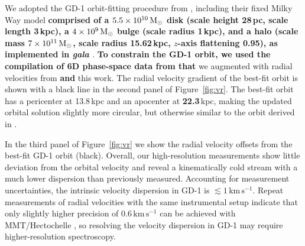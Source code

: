 \documentclass[twocolumn]{aastex63}
\newcommand{\package}[1]{\textsl{#1}}
\newcommand{\kms}{\ensuremath{\textrm{km}\,\textrm{s}^{-1}}}
\newcommand{\changes}[1]{{\textbf{#1}}}
\begin{document}
We adopted the GD-1 orbit-fitting procedure from \citet{pwb}, including their fixed Milky Way model \changes{comprised of a $5.5\times10^{10}\,\rm M_\odot$ \citet{mn1975} disk (scale height 28\,pc, scale length 3\,kpc), a $4\times10^9\,\rm M_\odot$ \citet{hernquist1990} bulge (scale radius 1\,kpc), and a \citet{navarro1997} halo (scale mass $7\times10^{11}\,\rm M_\odot$, scale radius 15.62\,kpc, $z$-axis flattening 0.95), as implemented in \package{gala} \citep{gala}}.
\changes{To constrain the GD-1 orbit, we used the compilation of 6D phase-space data from \citet{pwb} that} we augmented with radial velocities from \changes{\citet{huang2019} and} this work.
The radial velocity gradient of the best-fit orbit is shown with a black line in the second panel of Figure~\ref{fig:vr}.
The best-fit orbit has a pericenter at 13.8\,kpc and an apocenter at \changes{22.3}\,kpc, making the updated orbital solution slightly more circular, but otherwise similar to the orbit derived in \citet{pwb}.

In the third panel of Figure~\ref{fig:vr} we show the radial velocity offsets from the best-fit GD-1 orbit (black).
Overall, our high-resolution measurements show little deviation from the orbital velocity and reveal a kinematically cold stream with a much lower dispersion than previously measured.
Accounting for measurement uncertainties, the intrinsic velocity dispersion in GD-1 is $\lesssim1\,\kms$.
Repeat measurements of radial velocities with the same instrumental setup indicate that only slightly higher precision of $0.6\,\kms$ can be achieved with MMT/Hectochelle \citep{cargile2019}, so resolving the velocity dispersion in GD-1 may require higher-resolution spectroscopy.

\end{document}
